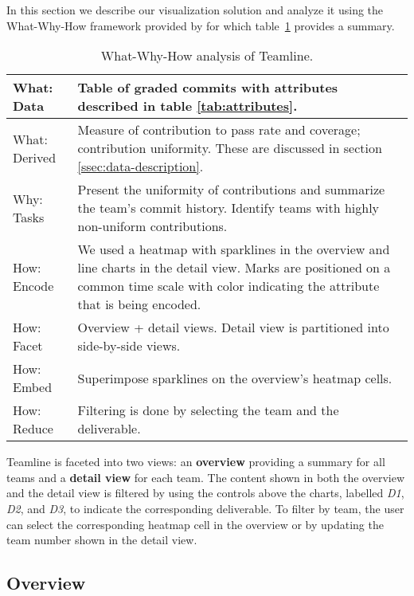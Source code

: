 \documentclass[../manifest.tex]{subfiles}
\begin{document}
In this section we describe our visualization solution and analyze it using the What-Why-How framework provided by \cite{Munzner:2014} for which table~\ref{tab:analysis} provides a summary.

\begin{table}
  \caption{What-Why-How analysis of Teamline.}
  \label{tab:analysis}
  \begin{tabularx}{\columnwidth}{ l | X }
    \hline
    What: Data & Table of graded commits with attributes described in table \ref{tab:attributes}. \\
    \hline
    What: Derived & Measure of contribution to pass rate and coverage; contribution uniformity. These are discussed in section \ref{ssec:data-description}. \\
    \hline
    Why: Tasks & Present the uniformity of contributions and summarize the team's commit history. Identify teams with highly non-uniform contributions. \\
    \hline
    How: Encode & We used a heatmap with sparklines in the overview  and line charts in the detail view. Marks are positioned on a common time scale with color indicating the attribute that is being encoded.\\
    \hline
    How: Facet & Overview + detail views. Detail view is partitioned into side-by-side views. \\
    \hline
    How: Embed & Superimpose sparklines on the overview's heatmap cells. \\
    \hline
    How: Reduce & Filtering is done by selecting the team and the deliverable. \\
    \hline
  \end{tabularx}
\end{table}

Teamline is faceted into two views: an \textbf{overview} providing a summary for all teams and a \textbf{detail view} for each team. The content shown in both the overview and the detail view is filtered by using the controls above the charts, labelled \textit{D1}, \textit{D2}, and \textit{D3}, to indicate the corresponding deliverable. To filter by team, the user can select the corresponding heatmap cell in the overview or by updating the team number shown in the detail view.

\subsection{Overview}
\end{document}
